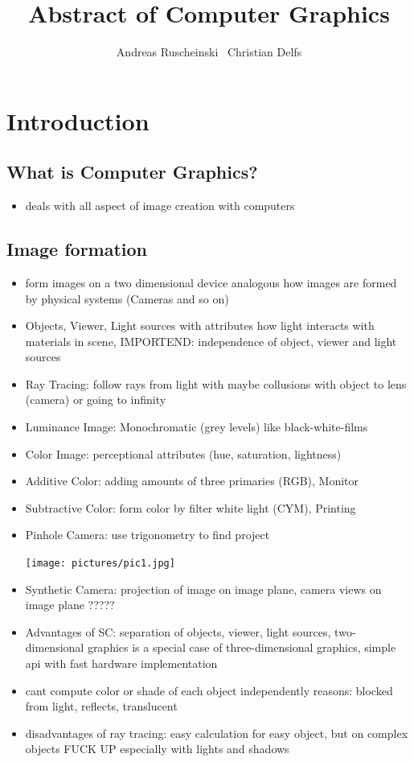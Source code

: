 \documentclass[11pt,a4paper]{article}
\title{Abstract of Computer Graphics}
\author{Andreas Ruscheinski \ Christian Delfs}
\date{}
\begin{document}
\maketitle

\section{Introduction}
	\subsection{What is Computer Graphics?}
		\begin{itemize}
			\item deals with all aspect of image creation with computers
		\end{itemize}
	\subsection{Image formation}
		\begin{itemize}
			\item form images on a two dimensional device analogous how images are formed by physical systems (Cameras and so on)
			\item Objects, Viewer, Light sources with attributes how light interacts with materials in scene, IMPORTEND: independence of object, viewer and light sources
			\item Ray Tracing: follow rays from light with maybe collusions with object to lens (camera) or going to infinity
			\item Luminance Image: Monochromatic (grey levels) like black-white-films
			\item Color Image: perceptional attributes (hue, saturation, lightness)
			\item Additive Color: adding amounts of three primaries (RGB), Monitor
			\item Subtractive Color: form color by filter white light (CYM), Printing
			\item Pinhole Camera: use trigonometry to find project 
			\begin{center}
				\texttt{[image: pictures/pic1.jpg]}
			\end{center}
			\item Synthetic Camera: projection of image on image plane, camera views on image plane ?????
			\item Advantages of SC: separation of objects, viewer, light sources, two-dimensional graphics is a special case of three-dimensional graphics, simple api with fast hardware implementation
			\item cant compute color or shade of each object independently reasons: blocked from light, reflects, translucent
			\item disadvantages of ray tracing: easy calculation for easy object, but on complex objects FUCK UP especially with lights and shadows
		\end{itemize}
\end{document}

